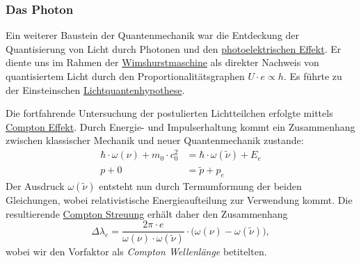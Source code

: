 \documentclass{subfiles}
\begin{document}
    \subsubsection*{Das Photon}\label{Ub:AtomEigenschaften.v}
		Ein weiterer Baustein der Quantenmechanik war die Entdeckung der Quantisierung von Licht durch Photonen und den \hyperref[subsec:Photoeffekt]{photoelektrischen Effekt}. Er diente uns im Rahmen der \hyperref[Ub:Wimshurstmaschine]{Wimshurstmaschine} als direkter Nachweis von quantisiertem Licht durch den Proportionalitätsgraphen $U\cdot e \propto h$. Es führte zu der Einsteinschen \hyperref[Ub:Lichtquantenhypothese]{Lichtquantenhypothese}. 

		Die fortfahrende Untersuchung der postulierten Lichtteilchen erfolgte mittels \hyperref[subsubsec:ComptonEffekt]{Compton Effekt}. Durch Energie- und Impulserhaltung kommt ein Zusammenhang zwischen klassischer Mechanik und neuer Quantenmechanik zustande:
		\begin{align*}
			\hbar\cdot\omega(\nu) + m_0\cdot c_0^2 &= \hbar\cdot\omega(\tilde\nu) + E_e \\
			p + 0 &= \tilde p + p_e
		\end{align*}
		Der Ausdruck $\omega(\tilde\nu)$ entsteht nun durch Termumformung der beiden Gleichungen, wobei relativistische Energieaufteilung zur Verwendung kommt. Die resultierende \hyperref[Ub:ComptonStreuung]{Compton Streuung} erhält daher den Zusammenhang
		\[
			\Delta\lambda_e = \frac{2\pi\cdot e}{\omega(\nu)\cdot\omega(\tilde\nu)}\cdot \bigl(\omega(\nu) - \omega(\tilde\nu)\bigr),
		\]
		wobei wir den Vorfaktor als \emph{Compton Wellenlänge} betitelten. 
\end{document}
